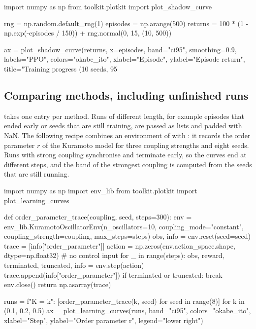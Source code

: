 \begin{pycode}
import numpy as np
from toolkit.plotkit import plot_shadow_curve

rng = np.random.default_rng(1)
episodes = np.arange(500)
returns = 100 * (1 - np.exp(-episodes / 150)) + rng.normal(0, 15, (10, 500))

ax = plot_shadow_curve(returns, x=episodes, band="ci95", smoothing=0.9,
                       labels="PPO", colors="okabe_ito",
                       xlabel="Episode", ylabel="Episode return",
                       title="Training progress (10 seeds, 95%
\end{pycode}

\subsection{Comparing methods, including unfinished runs}

 takes one entry per method. Runs of different
length, for example episodes that ended early or seeds that are still
training, are passed as lists and padded with NaN. The following recipe
combines an environment of  with : it records the
order parameter $r$ of the Kuramoto model for three coupling strengths and
eight seeds. Runs with strong coupling synchronise and terminate early, so the
curves end at different steps, and the band of the strongest coupling is
computed from the seeds that are still running.

\begin{pycode}
import numpy as np
import env_lib
from toolkit.plotkit import plot_learning_curves

def order_parameter_trace(coupling, seed, steps=300):
    env = env_lib.KuramotoOscillatorEnv(n_oscillators=10, coupling_mode="constant",
                                        coupling_strength=coupling, max_steps=steps)
    obs, info = env.reset(seed=seed)
    trace = [info["order_parameter"]]
    action = np.zeros(env.action_space.shape, dtype=np.float32)  # no control input
    for _ in range(steps):
        obs, reward, terminated, truncated, info = env.step(action)
        trace.append(info["order_parameter"])
        if terminated or truncated:
            break
    env.close()
    return np.asarray(trace)

runs = {f"K = {k}": [order_parameter_trace(k, seed) for seed in range(8)]
        for k in (0.1, 0.2, 0.5)}
ax = plot_learning_curves(runs, band="ci95", colors="okabe_ito",
                          xlabel="Step", ylabel="Order parameter r",
                          legend="lower right")
\end{pycode}

